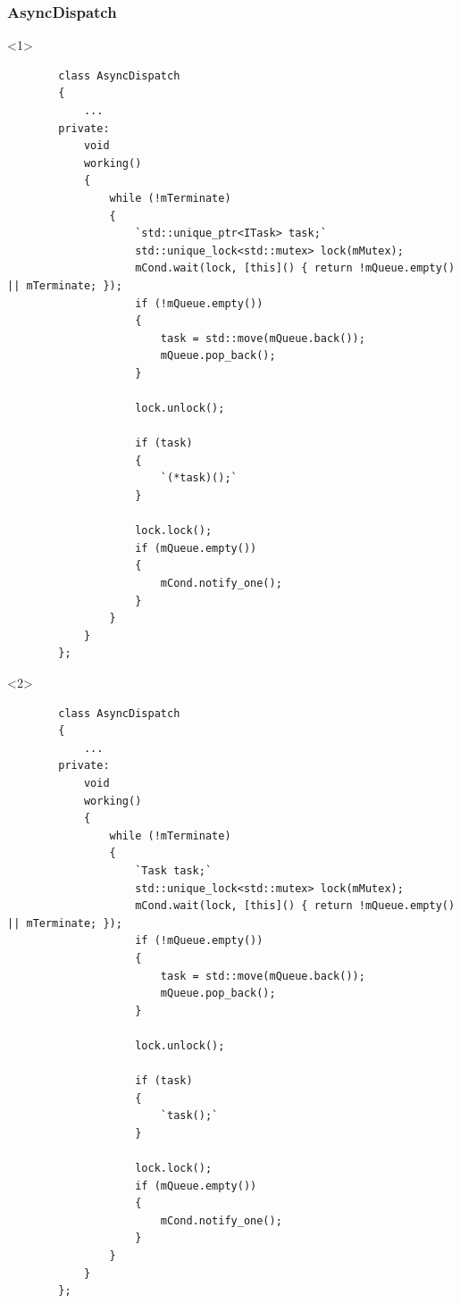 \documentclass{beamer}
\begin{document}
\begin{frame}[fragile]
\frametitle{AsyncDispatch}
    \begin{onlyenv}<1>
    \begin{lstlisting}
        class AsyncDispatch
        {
            ...
        private:
            void
            working()
            {
                while (!mTerminate)
                {
                    `std::unique_ptr<ITask> task;`
                    std::unique_lock<std::mutex> lock(mMutex);
                    mCond.wait(lock, [this]() { return !mQueue.empty() || mTerminate; });
                    if (!mQueue.empty())
                    {
                        task = std::move(mQueue.back());
                        mQueue.pop_back();
                    }

                    lock.unlock();

                    if (task)
                    {
                        `(*task)();`
                    }

                    lock.lock();
                    if (mQueue.empty())
                    {
                        mCond.notify_one();
                    }
                }
            }
        };
    \end{lstlisting}
    \end{onlyenv}

    \begin{onlyenv}<2>
    \begin{lstlisting}
        class AsyncDispatch
        {
            ...
        private:
            void
            working()
            {
                while (!mTerminate)
                {
                    `Task task;`
                    std::unique_lock<std::mutex> lock(mMutex);
                    mCond.wait(lock, [this]() { return !mQueue.empty() || mTerminate; });
                    if (!mQueue.empty())
                    {
                        task = std::move(mQueue.back());
                        mQueue.pop_back();
                    }

                    lock.unlock();

                    if (task)
                    {
                        `task();`
                    }

                    lock.lock();
                    if (mQueue.empty())
                    {
                        mCond.notify_one();
                    }
                }
            }
        };
    \end{lstlisting}
    \end{onlyenv}
\end{frame}
\end{document}
